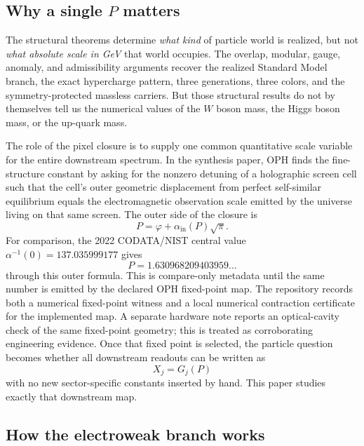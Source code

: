 \documentclass[11pt]{article}
\begin{document}
\subsection{Why a single \(P\) matters}

The structural theorems determine \emph{what kind} of particle world is
realized, but not \emph{what absolute scale in GeV} that world occupies. The overlap,
modular, gauge, anomaly, and admissibility arguments recover the realized Standard Model branch,
the exact hypercharge pattern, three generations, three colors, and the symmetry-protected
massless carriers. But those structural results do not by themselves tell us the numerical values
of the \(W\) boson mass, the Higgs boson mass, or the up-quark mass.

The role of the pixel closure is to supply one common quantitative scale
variable for the entire downstream spectrum. In the synthesis paper, OPH finds the fine-structure
constant by asking for the nonzero detuning of a holographic screen cell such that the cell's
outer geometric displacement from perfect self-similar equilibrium equals the electromagnetic
observation scale emitted by the universe living on that same screen.
The outer side of the closure is
\[
P=\varphi+\alpha_{\mathrm{in}}(P)\sqrt{\pi}.
\]
For comparison, the 2022 CODATA/NIST central value
\(\alpha^{-1}(0)=137.035999177\) gives
\[
P=1.630968209403959\ldots
\]
through this outer formula. This is compare-only metadata until the same number is emitted by the
declared OPH fixed-point map. The repository records both a numerical fixed-point witness and
a local numerical contraction certificate for the implemented map.
A separate hardware note reports an optical-cavity check of the same fixed-point geometry;
this is treated as corroborating engineering evidence.
Once that fixed point is selected, the particle question becomes whether all downstream readouts
can be written as
\[
X_j = G_j(P)
\]
with no new sector-specific constants inserted by hand. This paper studies exactly that downstream
map.

\subsection{How the electroweak branch works}
\end{document}
